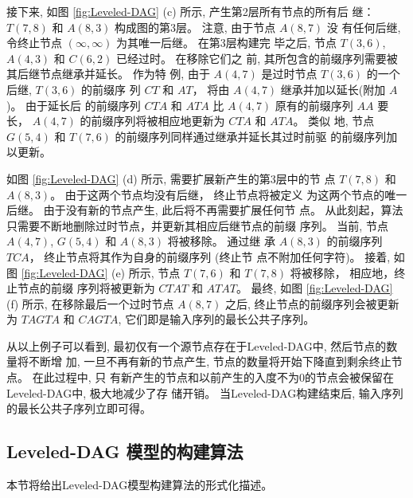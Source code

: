 接下来, 如图 \ref{fig:Leveled-DAG} (c) 所示, 产生第2层所有节点的所有后
继：$T(7, 8)$ 和 $A(8, 3)$ 构成图的第3层。 注意, 由于节点 $A(8, 7)$ 没
有任何后继, 令终止节点 $(\infty, \infty)$ 为其唯一后继。 在第3层构建完
毕之后, 节点 $T(3, 6)$, $A(4, 3)$ 和 $C(6, 2)$ 已经过时。 在移除它们之
前, 其所包含的前缀序列需要被其后继节点继承并延长。 作为特
例, 由于 $A(4, 7)$ 是过时节点 $T(3, 6)$ 的一个后继, $T(3, 6)$ 的前缀序
列 $CT$ 和 $AT$， 将由 $A(4, 7)$ 继承并加以延长(附加 $A$)。 由于延长后
的前缀序列 $CTA$ 和 $ATA$ 比 $A(4, 7)$ 原有的前缀序列 $AA$ 要
长， $A(4, 7)$ 的前缀序列将被相应地更新为 $CTA$ 和 $ATA$。 类似
地, 节点 $G(5, 4)$ 和 $T(7, 6)$ 的前缀序列同样通过继承并延长其过时前驱
的前缀序列加以更新。

如图 \ref{fig:Leveled-DAG} (d) 所示, 需要扩展新产生的第3层中的节
点 $T(7, 8)$ 和 $A(8, 3)$。 由于这两个节点均没有后继， 终止节点将被定义
为这两个节点的唯一后继。 由于没有新的节点产生, 此后将不再需要扩展任何节
点。 从此刻起，算法只需要不断地删除过时节点，并更新其相应后继节点的前缀
序列。 当前, 节点 $A(4, 7)$, $G(5, 4)$ 和 $A(8, 3)$ 将被移除。 通过继
承 $A(8, 3)$ 的前缀序列 $TCA$， 终止节点将其作为自身的前缀序列 (终止节
点不附加任何字符)。 接着, 如图 \ref{fig:Leveled-DAG}
(e) 所示, 节点 $T(7, 6)$ 和 $T(7, 8)$ 将被移除， 相应地，终止节点的前缀
序列将被更新为 $CTAT$ 和 $ATAT$。 最终, 如图 \ref{fig:Leveled-DAG} (f)
所示, 在移除最后一个过时节点 $A(8, 7)$ 之后, 终止节点的前缀序列会被更新
为 $TAGTA$ 和 $CAGTA$, 它们即是输入序列的最长公共子序列。

从以上例子可以看到, 最初仅有一个源节点存在于Leveled-DAG中, 然后节点的数量将不断增
加, 一旦不再有新的节点产生, 节点的数量将开始下降直到剩余终止节点。 在此过程中, 只
有新产生的节点和以前产生的入度不为0的节点会被保留在Leveled-DAG中, 极大地减少了存
储开销。 当Leveled-DAG构建结束后, 输入序列的最长公共子序列立即可得。

\subsection{Leveled-DAG 模型的构建算法 }
\label{sec:PMA}

本节将给出Leveled-DAG模型构建算法的形式化描述。\\

